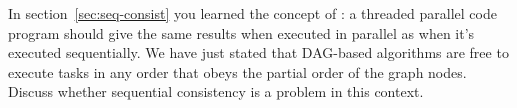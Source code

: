   In section~\ref{sec:seq-consist} you learned the concept of
  : a threaded parallel code program
  should give the same results when executed in parallel as when it's
  executed sequentially. We have just stated that \ac{DAG}-based
  algorithms are free to execute tasks in any order that obeys the
  partial order of the graph nodes. Discuss whether
  sequential consistency is a problem in this context.
